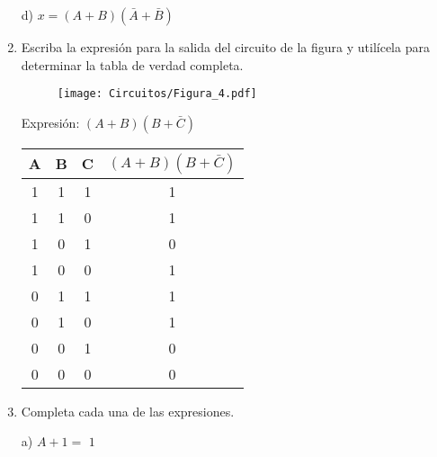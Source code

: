 \documentclass[a4paper, 12pt]{article}
\newcommand{\Aspace}{0.2cm}
\begin{document}
\begin{enumerate}
            \vspace{\Aspace} \par
            d) $x = (A + B)(\bar{A} + \bar{B})$
            \\ { \color{azul}  }



        \item Escriba la expresión para la salida del circuito de la figura y utilícela para determinar la tabla de verdad completa.
        \begin{figure}[!ht]
            \centering
            \texttt{[image: Circuitos/Figura\_4.pdf]}
        \end{figure}
            \vspace{\Aspace} \par
            {   \color{azul} Expresión: $(A + B)(B + \bar{C})$ \par \vspace{0.5cm}
                \begin{tabular}{c|c|c|c}
                    \textbf{A}  &   \textbf{B}  &   \textbf{C}  &   $(A + B)(B + \bar{C})$      \\ \hline
                    1           &   1           &   1           &   1                           \\
                    1           &   1           &   0           &   1                           \\
                    1           &   0           &   1           &   0                           \\
                    1           &   0           &   0           &   1                           \\
                    0           &   1           &   1           &   1                           \\
                    0           &   1           &   0           &   1                           \\
                    0           &   0           &   1           &   0                           \\
                    0           &   0           &   0           &   0                           \\
                \end{tabular}
            }
        


        \item Completa cada una de las expresiones.
            \vspace{\Aspace} \par
            a) $A + 1 = $
            { \color{azul} $1$ }


\end{enumerate}
\end{document}
